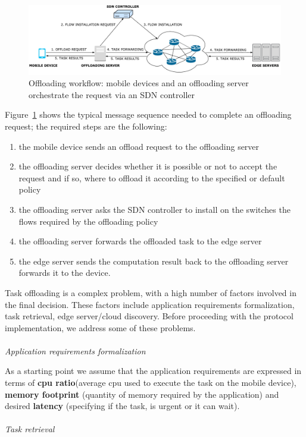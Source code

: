 \begin{figure}[]
\centering
\includegraphics[width=\textwidth]{img/protocol_sequence}   
\caption{Offloading workflow: mobile devices and an offloading server orchestrate the request via an SDN controller}
\label{fig:protocol}
\end{figure}

Figure~\ref{fig:protocol} shows the typical message sequence needed to complete an offloading request; the required steps are the following:
\begin{enumerate}
\item the mobile device sends an offload request to the offloading server
\item the offloading server decides whether it is possible or not to accept the request and if so, where to offload it according to the specified or default policy
\item the offloading server asks the SDN controller to install on the switches the flows required by the offloading policy
\item the offloading server forwards the offloaded task to the edge server 
\item the edge server sends the computation result back to the offloading server forwards it to the device.
\end{enumerate}

Task offloading is a complex problem, with a high number of factors involved in the final decision. These factors include application requirements formalization, task retrieval, edge server/cloud discovery. Before proceeding with the protocol implementation, we address some of these problems.\\\\
\textit{Application requirements formalization}

As a starting point we assume that the application requirements are expressed in terms of \textbf{cpu ratio}(average cpu used to execute the task on the mobile device), \textbf{memory footprint} (quantity of memory required by the application) and desired \textbf{latency} (specifying if the task, is urgent or it can wait).\\\\
\textit{Task retrieval}

